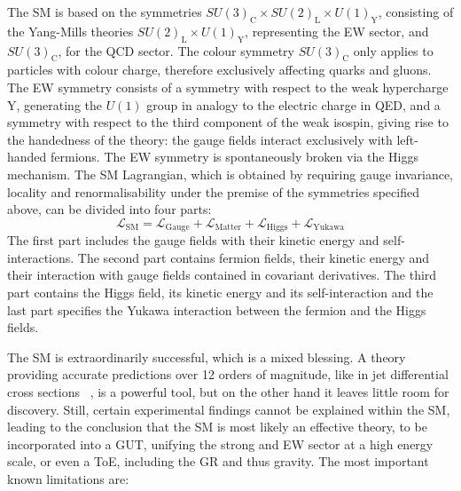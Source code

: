 The \gls{SM} is based on the symmetries $SU(3)_{\mathrm{C}} \times SU(2)_{\mathrm{L}} \times U(1)_{\mathrm{Y}}$, consisting of the Yang-Mills theories $SU(2)_{\mathrm{L}} \times U(1)_{\mathrm{Y}}$, representing the \gls{EW} sector, and $SU(3)_{\mathrm{C}}$, for the \gls{QCD} sector.
%
The colour symmetry $SU(3)_{\mathrm{C}}$ only applies to particles with colour charge, therefore exclusively affecting quarks and gluons.
% 
The \gls{EW} symmetry consists of a symmetry with respect to the weak hypercharge Y, generating the $U(1)$ group in analogy to the electric charge in \gls{QED}, and a symmetry with respect to the third component of the weak isospin, giving rise to the handedness of the theory: the gauge fields interact exclusively with left-handed fermions. 
%
The \gls{EW} symmetry is spontaneously broken via the Higgs mechanism. 
%
The \gls{SM} Lagrangian, which is obtained by requiring gauge invariance, locality and renormalisability under the premise of the symmetries specified above, can be divided into four parts:
%
\[
\mathcal{L}_{\mathrm{SM}}=\mathcal{L}_{\mathrm{Gauge}} + \mathcal{L}_{\mathrm{Matter}} + \mathcal{L}_{\mathrm{Higgs}} +\mathcal{L}_{\mathrm{Yukawa}}
\]
%
The first part includes the gauge fields with their kinetic energy and self-interactions. The second part contains fermion fields, their kinetic energy and their interaction with gauge fields contained in covariant derivatives. The third part contains the Higgs field, its kinetic energy and its self-interaction and the last part specifies the Yukawa interaction between the fermion and the Higgs fields.
%



The \gls{SM} is extraordinarily successful, which is a mixed blessing. A theory providing accurate predictions over 12 orders of magnitude, like in jet differential cross sections ~\cite{ATLAS:2011ac}, is a powerful tool, but on the other hand it leaves little room for discovery. 
%
Still, certain experimental findings cannot be explained within the \gls{SM}, leading to the conclusion that the \gls{SM} is most likely an effective theory, to be incorporated into a \gls{GUT}, unifying the strong and \gls{EW} sector at a high energy scale, or even a \gls{ToE}, including the \gls{GR} and thus gravity. The most important known limitations are:

